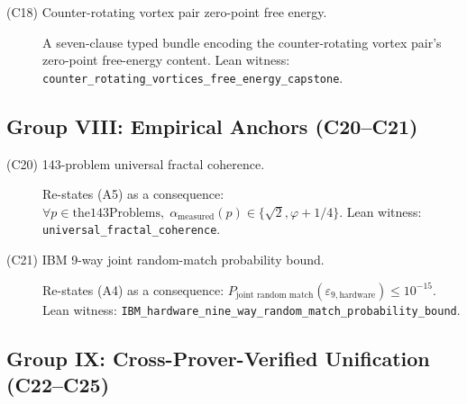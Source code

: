 \begin{description}
\item[\textnormal{(C18) Counter-rotating vortex pair zero-point free energy.}]
A seven-clause typed bundle encoding the counter-rotating
vortex pair's zero-point free-energy content. Lean witness:
\texttt{counter\_\allowbreak{}rotating\_\allowbreak{}vortices\_\allowbreak{}free\_\allowbreak{}energy\_\allowbreak{}capstone}.
\end{description}

\subsection{Group VIII: Empirical Anchors (C20--C21)}
\label{subsec:substrate-consequences-empirical}

\begin{description}
\item[\textnormal{(C20) 143-problem universal fractal coherence.}]
Re-states (A5) as a consequence: $\forall p \in
\text{the143Problems},\;\alpha_{\text{measured}}(p)
\in \{\sqrt{2}, \varphi + 1/4\}$. Lean witness:
\texttt{universal\_fractal\_coherence}.

\item[\textnormal{(C21) IBM 9-way joint random-match probability bound.}]
Re-states (A4) as a consequence:
$P_{\text{joint random match}}(\varepsilon_{9,\text{hardware}})
\le 10^{-15}$. Lean witness:
\texttt{IBM\_\allowbreak{}hardware\_\allowbreak{}nine\_\allowbreak{}way\_\allowbreak{}random\_\allowbreak{}match\_\allowbreak{}probability\_\allowbreak{}bound}.
\end{description}

\subsection{Group IX: Cross-Prover-Verified Unification (C22--C25)}
\label{subsec:substrate-consequences-unification}


